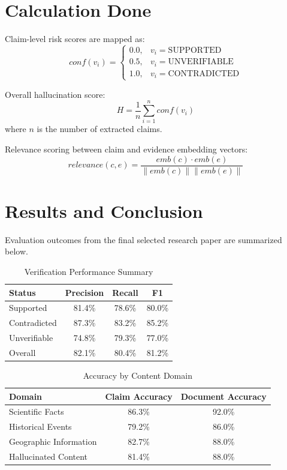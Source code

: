 \documentclass[12pt,a4paper]{report}
\begin{document}
\section{Calculation Done}
Claim-level risk scores are mapped as:
\begin{equation}
conf(v_i)=
\begin{cases}
0.0, & v_i=\text{SUPPORTED} \\
0.5, & v_i=\text{UNVERIFIABLE} \\
1.0, & v_i=\text{CONTRADICTED}
\end{cases}
\end{equation}

Overall hallucination score:
\begin{equation}
H=\frac{1}{n}\sum_{i=1}^{n} conf(v_i)
\end{equation}
where $n$ is the number of extracted claims.

Relevance scoring between claim and evidence embedding vectors:
\begin{equation}
relevance(c,e)=\frac{emb(c)\cdot emb(e)}{\|emb(c)\|\|emb(e)\|}
\end{equation}

\section{Results and Conclusion}
Evaluation outcomes from the final selected research paper are summarized below.

\begin{table}[h!]
\centering
\caption{Verification Performance Summary}
\begin{tabular}{lccc}
\toprule
Status & Precision & Recall & F1 \\
\midrule
Supported & 81.4\% & 78.6\% & 80.0\% \\
Contradicted & 87.3\% & 83.2\% & 85.2\% \\
Unverifiable & 74.8\% & 79.3\% & 77.0\% \\
\midrule
Overall & 82.1\% & 80.4\% & 81.2\% \\
\bottomrule
\end{tabular}
\end{table}

\begin{table}[h!]
\centering
\caption{Accuracy by Content Domain}
\begin{tabular}{lcc}
\toprule
Domain & Claim Accuracy & Document Accuracy \\
\midrule
Scientific Facts & 86.3\% & 92.0\% \\
Historical Events & 79.2\% & 86.0\% \\
Geographic Information & 82.7\% & 88.0\% \\
Hallucinated Content & 81.4\% & 88.0\% \\
\bottomrule
\end{tabular}
\end{table}
\end{document}
